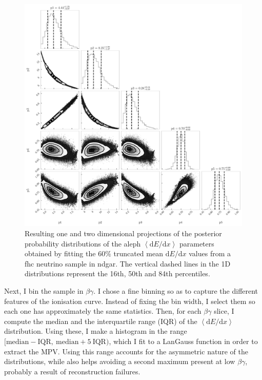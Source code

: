 \begin{figure}[t]
	\centering
	\includegraphics[width=.85\linewidth]{Images/GArSoft_PID/dEdx/mcmc_weighted_equal_frequency_bin_200.pdf}
	\caption[Resulting one and two dimensional projections of the posterior probability distributions of the \gls{aleph} $\left<\mathrm{d}E/\mathrm{d}x\right>$ parameters.]{Resulting one and two dimensional projections of the posterior probability distributions of the \gls{aleph} $\left<\mathrm{d}E/\mathrm{d}x\right>$ parameters obtained by fitting the $60\%$ truncated mean $\mathrm{d}E/\mathrm{d}x$ values from a \gls{fhc} neutrino sample in \gls{ndgar}. The vertical dashed lines in the 1D distributions represent the 16th, 50th and 84th percentiles.}
	\label{fig:dEdx_aleph_fit}
\end{figure}

Next, I bin the sample in $\beta\gamma$. I chose a fine binning so as to capture the different features of the ionisation curve. Instead of fixing the bin width, I select them so each one has approximately the same statistics. Then, for each $\beta\gamma$ slice, I compute the median and the interquartile range (IQR) of the $\left<\mathrm{d}E/\mathrm{d}x\right>$ distribution. Using these, I make a histogram in the range $[\mathrm{median}-\mathrm{IQR},~ \mathrm{median}+5~\mathrm{IQR})$, which I fit to a LanGauss function in order to extract the MPV. Using this range accounts for the asymmetric nature of the distributions, while also helps avoiding a second maximum present at low $\beta\gamma$, probably a result of reconstruction failures.

